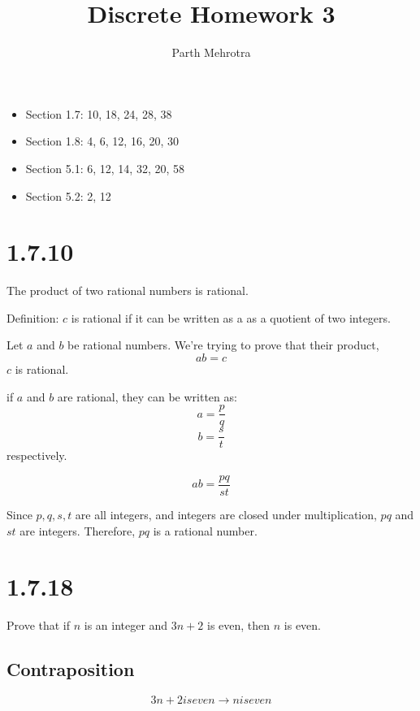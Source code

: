 \documentclass{article}
\begin{document}
	\title{Discrete Homework 3}
	\author{Parth Mehrotra}
	\maketitle

	\begin{itemize}
		\item{Section 1.7: 10, 18, 24, 28, 38}
		\item{Section 1.8: 4, 6, 12, 16, 20, 30}
		\item{Section 5.1: 6, 12, 14, 32, 20, 58}
		\item{Section 5.2: 2, 12}
	\end{itemize}
	\newpage
	
	\setlength{\parindent}{0cm} {
		\section*{1.7.10}
			The product of two rational numbers is rational.

			Definition: $c$ is rational if it can be written as a as a quotient of two integers.

			Let $a$ and $b$ be rational numbers. We're trying to prove that their product,
			\[
				ab = c
			\]
			$c$ is rational.

			if $a$ and $b$ are rational, they can be written as: 
			\[
				a = \frac{p}{q} 
			\]
			\[
				b = \frac{s}{t}
			\]
			respectively.

			\[
				ab = \frac{pq}{st}
			\]

			Since $p, q, s, t$ are all integers, and integers are closed under multiplication, $pq$ and $st$ are integers. Therefore, $pq$ is a rational number.
		\newpage
		\section*{1.7.18}
			Prove that if $n$ is an integer and $3n+2$ is even, then $n$ is even.
			\subsection*{Contraposition}
				\[
					3n+2 is even \rightarrow n is even
				\]
		\newpage
	}
\end{document}
